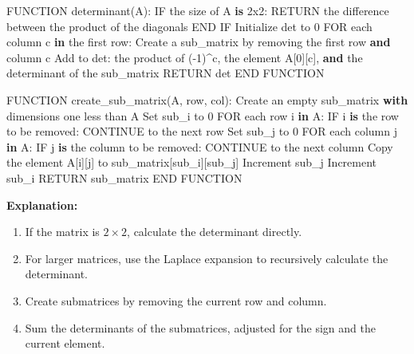 \documentclass[
  letterpaper,
  DIV=11,
  numbers=noendperiod]{scrreprt}
\newenvironment{Shaded}{\begin{snugshade}}{\end{snugshade}}
\newcommand{\BuiltInTok}[1]{\textcolor[rgb]{0.00,0.23,0.31}{#1}}
\newcommand{\ControlFlowTok}[1]{\textcolor[rgb]{0.00,0.23,0.31}{\textbf{#1}}}
\newcommand{\DecValTok}[1]{\textcolor[rgb]{0.68,0.00,0.00}{#1}}
\newcommand{\ErrorTok}[1]{\textcolor[rgb]{0.68,0.00,0.00}{#1}}
\newcommand{\KeywordTok}[1]{\textcolor[rgb]{0.00,0.23,0.31}{\textbf{#1}}}
\newcommand{\NormalTok}[1]{\textcolor[rgb]{0.00,0.23,0.31}{#1}}
\newcommand{\OperatorTok}[1]{\textcolor[rgb]{0.37,0.37,0.37}{#1}}
\providecommand{\tightlist}{%
  \setlength{\itemsep}{0pt}\setlength{\parskip}{0pt}}\usepackage{longtable,booktabs,array}
\theoremstyle{plain}
\theoremstyle{definition}
\theoremstyle{remark}
\begin{document}
\begin{Shaded}
\begin{Highlighting}[]
\NormalTok{FUNCTION determinant(A):}
\NormalTok{    IF the size of A }\KeywordTok{is} \DecValTok{2}\ErrorTok{x2}\NormalTok{:}
\NormalTok{        RETURN the difference between the product of the diagonals}
\NormalTok{    END IF}
\NormalTok{    Initialize det to }\DecValTok{0}
\NormalTok{    FOR each column c }\KeywordTok{in}\NormalTok{ the first row:}
\NormalTok{        Create a sub\_matrix by removing the first row }\KeywordTok{and}\NormalTok{ column c}
\NormalTok{        Add to det: the product of (}\OperatorTok{{-}}\DecValTok{1}\NormalTok{)}\OperatorTok{\^{}}\NormalTok{c, the element A[}\DecValTok{0}\NormalTok{][c], }\KeywordTok{and}\NormalTok{ the determinant of the sub\_matrix}
\NormalTok{    RETURN det}
\NormalTok{END FUNCTION}

\NormalTok{FUNCTION create\_sub\_matrix(A, row, col):}
\NormalTok{    Create an empty sub\_matrix }\ControlFlowTok{with}\NormalTok{ dimensions one less than A}
\NormalTok{    Set sub\_i to }\DecValTok{0}
\NormalTok{    FOR each row i }\KeywordTok{in}\NormalTok{ A:}
\NormalTok{        IF i }\KeywordTok{is}\NormalTok{ the row to be removed:}
\NormalTok{            CONTINUE to the }\BuiltInTok{next}\NormalTok{ row}
\NormalTok{        Set sub\_j to }\DecValTok{0}
\NormalTok{        FOR each column j }\KeywordTok{in}\NormalTok{ A:}
\NormalTok{            IF j }\KeywordTok{is}\NormalTok{ the column to be removed:}
\NormalTok{                CONTINUE to the }\BuiltInTok{next}\NormalTok{ column}
\NormalTok{            Copy the element A[i][j] to sub\_matrix[sub\_i][sub\_j]}
\NormalTok{            Increment sub\_j}
\NormalTok{        Increment sub\_i}
\NormalTok{    RETURN sub\_matrix}
\NormalTok{END FUNCTION}
\end{Highlighting}
\end{Shaded}

\textbf{Explanation:}

\begin{enumerate}
\def\labelenumi{\arabic{enumi}.}
\tightlist
\item
  If the matrix is \(2×2\), calculate the determinant directly.
\item
  For larger matrices, use the Laplace expansion to recursively
  calculate the determinant.
\item
  Create submatrices by removing the current row and column.
\item
  Sum the determinants of the submatrices, adjusted for the sign and the
  current element.
\end{enumerate}
\end{document}
